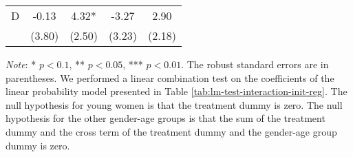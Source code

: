 \documentclass[12pt, a4paper]{article}
\begin{document}
\begin{table}[H]
\begin{threeparttable}
\begin{tabular}[t]{lcccc}
\hspace{1em}D & -0.13 & 4.32* & -3.27 & 2.90\\
\hspace{1em} & (3.80) & (2.50) & (3.23) & (2.18)\\
\bottomrule
\end{tabular}
\begin{tablenotes}
\item \emph{Note}: * $p < 0.1$, ** $p < 0.05$, *** $p < 0.01$. The robust standard errors are in parentheses. We performed a linear combination test on the coefficients of the linear probability model presented in Table \ref{tab:lm-test-interaction-init-reg}. The null hypothesis for young women is that the treatment dummy is zero. The null hypothesis for the other gender-age groups is that the sum of the treatment dummy and the cross term of the treatment dummy and the gender-age group dummy is zero.
\end{tablenotes}
\end{threeparttable}
\end{table}
\end{document}
